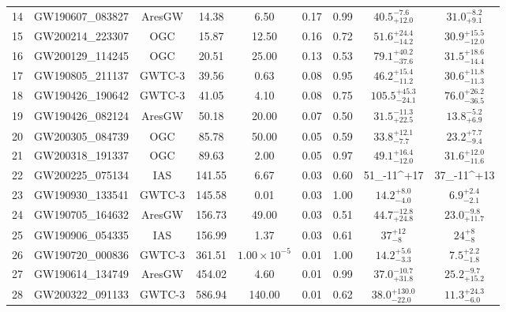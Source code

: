 \begin{table*}[ht]
\begin{tabular}{!{\vrule width 1pt}lcccccccc!{\vrule width 1pt}}
14 & GW190607\_083827 & AresGW & 14.38 & 6.50 & 0.17 & 0.99 & $40.5_{+12.0}^{-7.6}$ & $31.0_{+9.1}^{-8.2}$ \\
15 & GW200214\_223307 & OGC & 15.87 & 12.50 & 0.16 & 0.72 & $51.6^{+24.4}_{-14.2}$ & $30.9^{+15.5}_{-12.0}$ \\
16 & GW200129\_114245 & OGC & 20.51 & 25.00 & 0.13 & 0.53 & $79.1^{+40.2}_{-37.6}$ & $31.5^{+18.6}_{-14.4}$ \\
17 & GW190805\_211137 & GWTC-3 & 39.56 & 0.63 & 0.08 & 0.95 & $46.2^{+15.4}_{-11.2}$ & $30.6^{+11.8}_{-11.3}$ \\
18 & GW190426\_190642 & GWTC-3 & 41.05 & 4.10 & 0.08 & 0.75 & $105.5^{+45.3}_{-24.1}$ & $76.0^{+26.2}_{-36.5}$ \\
19 & GW190426\_082124 & AresGW & 50.18 & 20.00 & 0.07 & 0.50 & $31.5_{+22.5}^{-11.3}$ & $13.8_{+6.9}^{-5.2}$ \\
20 & GW200305\_084739 & OGC & 85.78 & 50.00 & 0.05 & 0.59 & $33.8^{+12.1}_{-7.7}$ & $23.2^{+7.7}_{-9.4}$ \\
21 & GW200318\_191337 & OGC & 89.63 & 2.00 & 0.05 & 0.97 & $49.1^{+16.4}_{-12.0}$ & $31.6^{+12.0}_{-11.6}$ \\
22 & GW200225\_075134 & IAS & 141.55 & 6.67 & 0.03 & 0.60 & 51_{-11}^{+17} & 37_{-11}^{+13} \\
23 & GW190930\_133541 & GWTC-3 & 145.58 & 0.01 & 0.03 & 1.00 & $14.2^{+8.0}_{-4.0}$ & $6.9^{+2.4}_{-2.1}$ \\
24 & GW190705\_164632 & AresGW & 156.73 & 49.00 & 0.03 & 0.51 & $44.7_{+24.8}^{-12.8}$ & $23.0_{+11.7}^{-9.8}$ \\
25 & GW190906\_054335 & IAS & 156.99 & 1.37 & 0.03 & 0.61 & $37_{-8}^{+12}$ & $24_{-8}^{+8}$ \\
26 & GW190720\_000836 & GWTC-3 & 361.51 & $1.00 \times 10^{-5}$ & 0.01 & 1.00 & $14.2^{+5.6}_{-3.3}$ & $7.5^{+2.2}_{-1.8}$ \\
27 & GW190614\_134749 & AresGW & 454.02 & 4.60 & 0.01 & 0.99 & $37.0_{+31.8}^{-10.7}$ & $25.2_{+15.2}^{-9.7}$ \\
28 & GW200322\_091133 & GWTC-3 & 586.94 & 140.00 & 0.01 & 0.62 & $38.0^{+130.0}_{-22.0}$ & $11.3^{+24.3}_{-6.0}$ \\
\bottomrule[1pt]
\end{tabular}

\end{table*}

